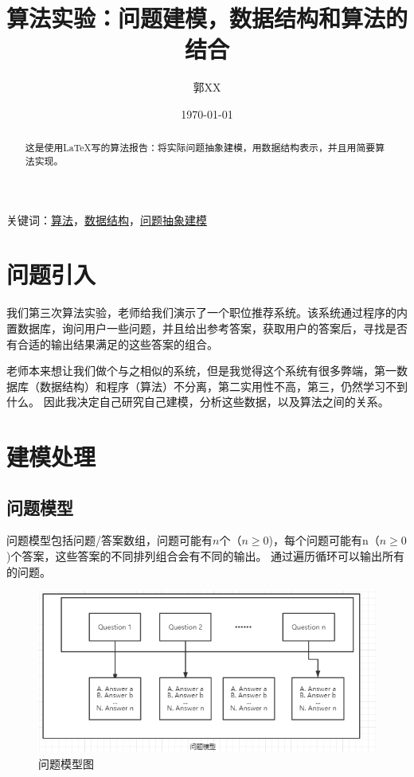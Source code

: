\documentclass[UTF8,18pt]{ctexart}
\title{\heiti 算法实验：问题建模，数据结构和算法的结合}
\author{\kaishu 郭XX}
\affil{\small{xxxxxxxxx，物联网 xxxx，XX 大学}}
\date{\today}
\begin{document}
\maketitle
\begin{abstract}
这是使用\LaTeX 写的算法报告：将实际问题抽象建模，用数据结构表示，并且用简要算法实现。
\end{abstract}
{\small 关键词：\underline{算法}，\underline{数据结构}，\underline{问题抽象建模}

\tableofcontents
\section{问题引入}
我们第三次算法实验，老师给我们演示了一个职位推荐系统。该系统通过程序的内置数据库，询问用户一些问题，并且给出参考答案，获取用户的答案后，寻找是否有合适的输出结果满足的这些答案的组合。

老师本来想让我们做个与之相似的系统，但是我觉得这个系统有很多弊端，第一数据库（数据结构）和程序（算法）不分离，第二实用性不高，第三，仍然学习不到什么。
因此我决定自己研究自己建模，分析这些数据，以及算法之间的关系。
\section{建模处理}
\subsection{问题模型}
问题模型包括问题/答案数组，问题可能有$n$个（$n \geqslant 0$)，每个问题可能有n（$n \geqslant 0$)个答案，这些答案的不同排列组合会有不同的输出。
通过遍历循环可以输出所有的问题。
\begin{figure}[H]
	\centering
	\includegraphics[scale=0.6]{wtmx.png}
	\caption{问题模型图}
	\label{fig:问题模型}
\end{figure}
}
\end{document}
